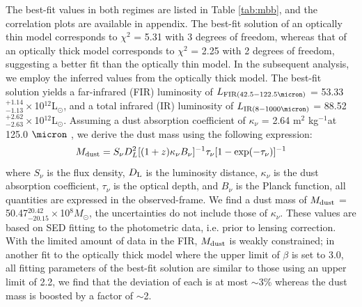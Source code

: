 \documentclass[twocolumn,apj,numberedappendix]{emulateapj}
\newcommand{\Msun}{\mbox{$M_{\odot}$}}
\newcommand{\Lsun}{\mbox{L$_{\odot}$}}
\newcommand{\pmOne}{$^{-1}$}
\begin{document}

The best-fit values in both regimes are listed in Table \ref{tab:mbb}, and the correlation plots are available in appendix. The best-fit solution of an optically thin
model corresponds to $\chi^2$ = 5.31 with 3 degrees of freedom, whereas that of an optically thick model
corresponds to $\chi^2$ = 2.25 with 2 degrees of freedom, suggesting a better fit than the optically thin
model. In the subsequent analysis, we employ the inferred values from the optically thick model.
The best-fit solution yields a far-infrared (FIR) luminosity of $L_{\rm FIR (42.5-122.5\micron)}$ = 53.33$^{+1.14}_{-1.13}\times$10$^{12}$\Lsun, and a total infrared (IR) luminosity of $L_{\rm IR (8-1000 \micron)}$ = 88.52$^{+2.62}_{-2.63}\times$10$
^{12}$\Lsun. Assuming a dust absorption coefficient of $\kappa_{\nu}$ = 2.64 m$^2$ kg\pmOne at 125.0 $
\micron$ \citep{Dunne03a}, we derive the dust mass using the following expression:
\begin{equation}
M_{\rm dust} = S_{\nu} D_{L}^2 [(1 + z) \kappa_{\nu} B_{\nu}]^{-1} \tau_{\nu} [1-
\exp(-\tau_{\nu})]^{-1}
\end{equation}
where $S_{\nu}$ is the flux density, $D_{\rm L}$ is the luminosity distance, $\kappa_{\nu}$ is the dust
absorption coefficient, $\tau_{\nu}$ is the optical depth, and $B_{\nu}$ is the Planck function,
all quantities are expressed in the observed-frame. We find a dust mass of $M_{\rm dust}$ =
50.47$^{20.42}_{-20.15}\times$10$^8$\Msun, the uncertainties do not include those of $\kappa_{\nu}$. These values are based on SED fitting to the photometric data, i.e. prior
to lensing correction. With the limited amount of data in the FIR, $M_{\rm dust}$ is weakly constrained; in another fit to the optically thick model where the upper limit of $\beta$ is set to 3.0, all fitting parameters of the best-fit solution are similar to those using an upper limit of 2.2, we find that the deviation of each is at most $\sim$3\% whereas the dust mass is boosted by a factor of $\sim$2. 
\end{document}
